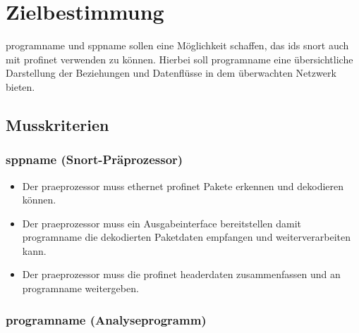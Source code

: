 \chapter{Zielbestimmung}

\gls{programname} und \gls{sppname} sollen eine Möglichkeit schaffen, das \gls{ids} \gls{snort} auch mit \gls{profinet} verwenden zu können.
Hierbei soll \gls{programname} eine übersichtliche Darstellung der Beziehungen und Datenflüsse in dem überwachten Netzwerk bieten.

\section{Musskriterien}

\subsection{\gls{sppname} (Snort-Präprozessor)}

\begin{itemize}
\item Der \gls{praeprozessor} muss \gls{ethernet} \gls{profinet} Pakete erkennen und dekodieren können.

\item Der \gls{praeprozessor} muss ein Ausgabeinterface bereitstellen damit \gls{programname} die dekodierten Paketdaten empfangen und weiterverarbeiten kann.

\item Der \gls{praeprozessor} muss die \gls{profinet} \gls{headerdaten} zusammenfassen und an \gls{programname} weitergeben.
\end{itemize}

\subsection{\gls{programname} (Analyseprogramm)}

